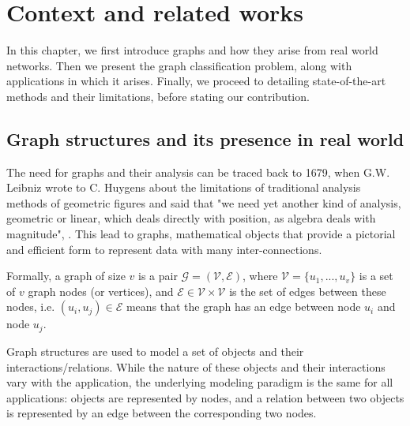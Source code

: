 \addchapheadtotoc
\chapter{Context and related works}

In this chapter, we first introduce graphs and how they arise from real world networks. Then we present the graph classification problem, along with applications in which it arises. Finally, we proceed to detailing state-of-the-art methods and their limitations, before stating our contribution. 
 
\section{Graph structures and its presence in real world}

The need for graphs and their analysis can be traced back to 1679, when G.W.  Leibniz  wrote to C. Huygens about the limitations of traditional analysis methods of geometric figures and said that "we need yet another kind of analysis, geometric or linear, which deals directly with position, as algebra deals with magnitude", \citep{Graph_application}. This lead to graphs, mathematical objects that provide a pictorial and efficient form to represent data with many inter-connections. %

Formally, a graph of size $v$ is a pair $\mathcal{G}=(\mathcal{V},\mathcal{E})$, where $\mathcal{V}=\{u_1,...,u_v\}$ is a set of $v$ graph nodes (or vertices), and $\mathcal{E}\in \mathcal{V}\times \mathcal{V}$ is the set of edges between these nodes, i.e. $(u_i, u_j)\in \mathcal{E}$ means that the graph has an edge between node $u_i$ and node $u_j$.

Graph structures are used to model a set of objects and their interactions/relations. %
While the nature of these objects and their interactions vary with the application, the underlying modeling paradigm is the same for all applications: objects are represented by nodes, and a relation between two objects is represented by an edge between the corresponding two nodes.  

